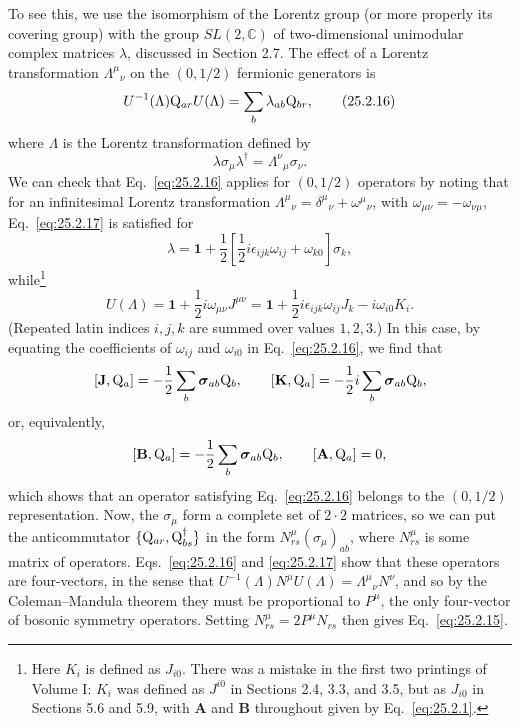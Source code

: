 To see this, we use the isomorphism of the Lorentz group (or more properly
its covering group) with the group \(SL(2,\mathbb C)\) of two-dimensional
unimodular complex matrices \(\lambda\), discussed in Section 2.7. The
effect of a Lorentz transformation \(\Lambda^\mu{}_\nu\) on the
\((0,1/2)\) fermionic generators is
\begin{equation}
U^{-1}(\Lambda)\mathrm{Q}_{ar}U(\Lambda)
=\sum_b\lambda_{ab}\mathrm{Q}_{br},
\tag{25.2.16}\label{eq:25.2.16}
\end{equation}
where \(\Lambda\) is the Lorentz transformation defined by
\begin{equation}
\lambda\sigma_\mu\lambda^\dagger
=\Lambda^\nu{}_\mu\sigma_\nu.
\tag{25.2.17}\label{eq:25.2.17}
\end{equation}
We can check that Eq.~\eqref{eq:25.2.16} applies for \((0,1/2)\) operators
by noting that for an infinitesimal Lorentz transformation
\(\Lambda^\mu{}_\nu=\delta^\mu{}_\nu+\omega^\mu{}_\nu\), with
\(\omega_{\mu\nu}=-\omega_{\nu\mu}\), Eq.~\eqref{eq:25.2.17} is satisfied
for
\[
\lambda
=\mathbf{1}
+\frac12\left[\frac12i\epsilon_{ijk}\omega_{ij}+\omega_{k0}\right]\sigma_k,
\]
while\footnote{Here \(K_i\) is defined as \(J_{i0}\). There was a mistake
in the first two printings of Volume I: \(K_i\) was defined as \(J^{i0}\)
in Sections 2.4, 3.3, and 3.5, but as \(J_{i0}\) in Sections 5.6 and 5.9,
with \(\mathbf A\) and \(\mathbf B\) throughout given by
Eq.~\eqref{eq:25.2.1}.}
\[
U(\Lambda)
=\mathbf{1}+\frac12i\omega_{\mu\nu}J^{\mu\nu}
=\mathbf{1}+\frac12i\epsilon_{ijk}\omega_{ij}J_k-i\omega_{i0}K_i.
\]
(Repeated latin indices \(i,j,k\) are summed over values \(1,2,3\).) In
this case, by equating the coefficients of \(\omega_{ij}\) and
\(\omega_{i0}\) in Eq.~\eqref{eq:25.2.16}, we find that
\[
[\mathbf J,\mathrm{Q}_a]
=-\frac12\sum_b\boldsymbol{\sigma}_{ab}\mathrm{Q}_b,
\qquad
[\mathbf K,\mathrm{Q}_a]
=-\frac12i\sum_b\boldsymbol{\sigma}_{ab}\mathrm{Q}_b,
\]
or, equivalently,
\[
[\mathbf B,\mathrm{Q}_a]
=-\frac12\sum_b\boldsymbol{\sigma}_{ab}\mathrm{Q}_b,
\qquad
[\mathbf A,\mathrm{Q}_a]=0,
\]
which shows that an operator satisfying Eq.~\eqref{eq:25.2.16} belongs to
the \((0,1/2)\) representation. Now, the \(\sigma_\mu\) form a complete
set of \(2\cdot2\) matrices, so we can put the anticommutator
\(\{\mathrm{Q}_{ar},\mathrm{Q}_{bs}^\dagger\}\) in the form
\(N^\mu_{rs}(\sigma_\mu)_{ab}\), where \(N^\mu_{rs}\) is some matrix of
operators. Eqs.~\eqref{eq:25.2.16} and \eqref{eq:25.2.17} show that these
operators are four-vectors, in the sense that
\(U^{-1}(\Lambda)N^\mu U(\Lambda)=\Lambda^\mu{}_\nu N^\nu\), and so by
the Coleman--Mandula theorem they must be proportional to \(P^\mu\), the
only four-vector of bosonic symmetry operators. Setting
\(N^\mu_{rs}=2P^\mu N_{rs}\) then gives Eq.~\eqref{eq:25.2.15}.

